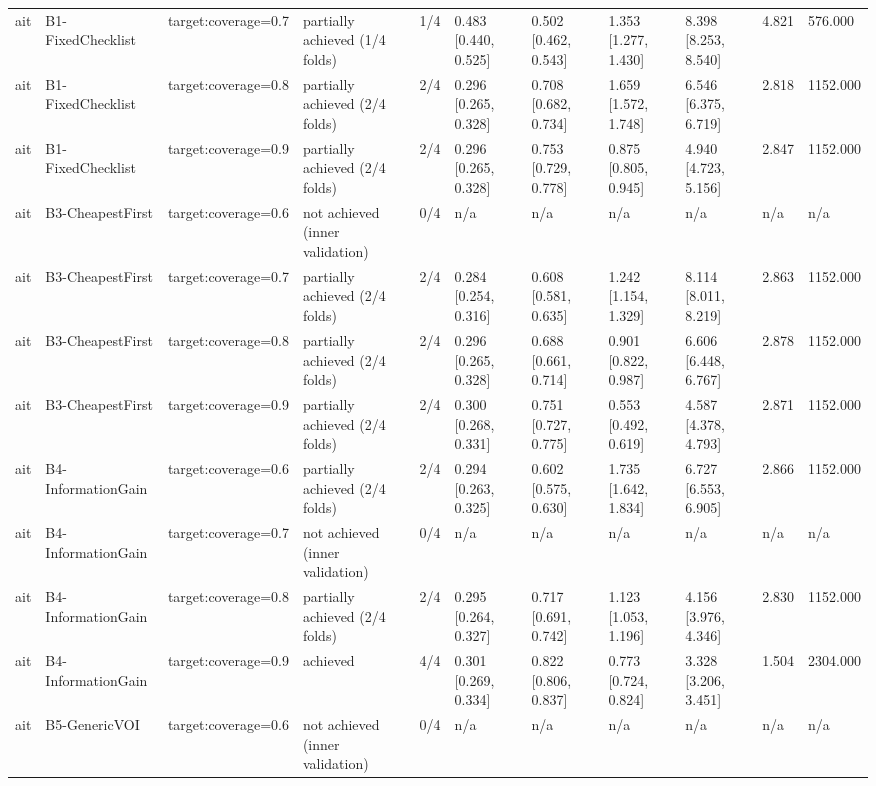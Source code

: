 \begin{table}[!ht]
{\begin{tabular}{lllllllllll}
ait & B1-FixedChecklist & target:coverage=0.7 & partially achieved (1/4 folds) & 1/4 & 0.483 [0.440, 0.525] & 0.502 [0.462, 0.543] & 1.353 [1.277, 1.430] & 8.398 [8.253, 8.540] & 4.821 & 576.000 \\
ait & B1-FixedChecklist & target:coverage=0.8 & partially achieved (2/4 folds) & 2/4 & 0.296 [0.265, 0.328] & 0.708 [0.682, 0.734] & 1.659 [1.572, 1.748] & 6.546 [6.375, 6.719] & 2.818 & 1152.000 \\
ait & B1-FixedChecklist & target:coverage=0.9 & partially achieved (2/4 folds) & 2/4 & 0.296 [0.265, 0.328] & 0.753 [0.729, 0.778] & 0.875 [0.805, 0.945] & 4.940 [4.723, 5.156] & 2.847 & 1152.000 \\
ait & B3-CheapestFirst & target:coverage=0.6 & not achieved (inner validation) & 0/4 & n/a & n/a & n/a & n/a & n/a & n/a \\
ait & B3-CheapestFirst & target:coverage=0.7 & partially achieved (2/4 folds) & 2/4 & 0.284 [0.254, 0.316] & 0.608 [0.581, 0.635] & 1.242 [1.154, 1.329] & 8.114 [8.011, 8.219] & 2.863 & 1152.000 \\
ait & B3-CheapestFirst & target:coverage=0.8 & partially achieved (2/4 folds) & 2/4 & 0.296 [0.265, 0.328] & 0.688 [0.661, 0.714] & 0.901 [0.822, 0.987] & 6.606 [6.448, 6.767] & 2.878 & 1152.000 \\
ait & B3-CheapestFirst & target:coverage=0.9 & partially achieved (2/4 folds) & 2/4 & 0.300 [0.268, 0.331] & 0.751 [0.727, 0.775] & 0.553 [0.492, 0.619] & 4.587 [4.378, 4.793] & 2.871 & 1152.000 \\
ait & B4-InformationGain & target:coverage=0.6 & partially achieved (2/4 folds) & 2/4 & 0.294 [0.263, 0.325] & 0.602 [0.575, 0.630] & 1.735 [1.642, 1.834] & 6.727 [6.553, 6.905] & 2.866 & 1152.000 \\
ait & B4-InformationGain & target:coverage=0.7 & not achieved (inner validation) & 0/4 & n/a & n/a & n/a & n/a & n/a & n/a \\
ait & B4-InformationGain & target:coverage=0.8 & partially achieved (2/4 folds) & 2/4 & 0.295 [0.264, 0.327] & 0.717 [0.691, 0.742] & 1.123 [1.053, 1.196] & 4.156 [3.976, 4.346] & 2.830 & 1152.000 \\
ait & B4-InformationGain & target:coverage=0.9 & achieved & 4/4 & 0.301 [0.269, 0.334] & 0.822 [0.806, 0.837] & 0.773 [0.724, 0.824] & 3.328 [3.206, 3.451] & 1.504 & 2304.000 \\
ait & B5-GenericVOI & target:coverage=0.6 & not achieved (inner validation) & 0/4 & n/a & n/a & n/a & n/a & n/a & n/a \\

\end{tabular}}
\end{table}
